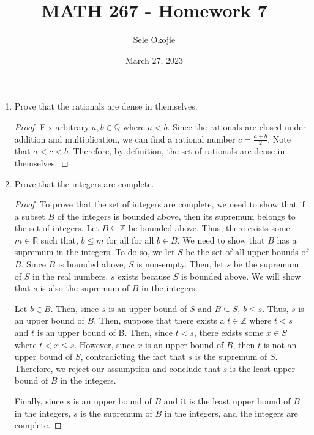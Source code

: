 \documentclass{article}
\title{MATH 267 - Homework 7}
\author{Sele Okojie}
\date{March 27, 2023}
\begin{document}
    \maketitle

    \begin{enumerate}

	\item Prove that the rationals are dense in themselves.
            \begin{proof}
                Fix arbitrary $a, b\in\mathbb{Q}$ where $a < b$. Since the rationals are closed under addition and multiplication, we can find a rational number $c = \frac{a + b}{2}$. Note that $a < c < b$. Therefore, by definition, the set of rationals are dense in themselves.
            \end{proof}

	\item Prove that the integers are complete.
            \begin{proof}
                To prove that the set of integers are complete, we need to show that if a subset $B$ of the integers is bounded above, then its supremum belongs to the set of integers. 
                \ppar Let $B \subseteq \mathbb{Z}$ be bounded above. Thus, there exists some $m\in\mathbb{R}$ such that, $b \le m$ for all for all $b\in B$. We need to show that $B$ has a supremum in the integers. To do so, we let $S$ be the set of all upper bounds of $B$. Since $B$ is bounded above, $S$ is non-empty. Then, let $s$ be the supremum of $S$ in the real numbers. $s$ exists because $S$ is bounded above. We will show that $s$ is also the supremum of $B$ in the integers.
                
                \ppar Let $b\in B$. Then, since $s$ is an upper bound of $S$ and $B\subseteq S$, $b \le s$. Thus, $s$ is an upper bound of $B$. Then, suppose that there exists a $t \in\mathbb{Z}$ where $t < s$ and $t$ is an upper bound of B. Then, since $t < s$, there exists some $x \in S$ where $t < x \le s$. However, since $x$ is an upper bound of $B$, then $t$ is not an upper bound of $S$, contradicting the fact that $s$ is the supremum of $S$. Therefore, we reject our assumption and conclude that $s$ is the least upper bound of $B$ in the integers.
                
                \ppar Finally, since $s$ is an upper bound of $B$ and it is the least upper bound of $B$ in the integers, $s$ is the supremum of $B$ in the integers, and the integers are complete.
            \end{proof}
        

\end{enumerate}
\end{document}
